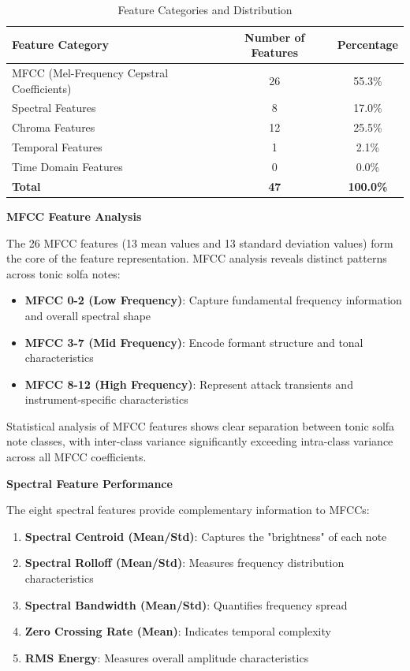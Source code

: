 \documentclass[12pt,a4paper]{article}
\begin{document}
\begin{table}[H]
\centering
\caption{Feature Categories and Distribution}
\label{tab:feature_categories}
\begin{tabular}{@{}lcc@{}}
\toprule
\textbf{Feature Category} & \textbf{Number of Features} & \textbf{Percentage} \\
\midrule
MFCC (Mel-Frequency Cepstral Coefficients) & 26 & 55.3\% \\
Spectral Features & 8 & 17.0\% \\
Chroma Features & 12 & 25.5\% \\
Temporal Features & 1 & 2.1\% \\
Time Domain Features & 0 & 0.0\% \\
\midrule
\textbf{Total} & \textbf{47} & \textbf{100.0\%} \\
\bottomrule
\end{tabular}
\end{table}

\textbf{MFCC Feature Analysis}

The 26 MFCC features (13 mean values and 13 standard deviation values) form the core of the feature representation. MFCC analysis reveals distinct patterns across tonic solfa notes:

\begin{itemize}
\item \textbf{MFCC 0-2 (Low Frequency)}: Capture fundamental frequency information and overall spectral shape
\item \textbf{MFCC 3-7 (Mid Frequency)}: Encode formant structure and tonal characteristics
\item \textbf{MFCC 8-12 (High Frequency)}: Represent attack transients and instrument-specific characteristics
\end{itemize}

Statistical analysis of MFCC features shows clear separation between tonic solfa note classes, with inter-class variance significantly exceeding intra-class variance across all MFCC coefficients.

\textbf{Spectral Feature Performance}

The eight spectral features provide complementary information to MFCCs:

\begin{enumerate}
\item \textbf{Spectral Centroid (Mean/Std)}: Captures the "brightness" of each note
\item \textbf{Spectral Rolloff (Mean/Std)}: Measures frequency distribution characteristics
\item \textbf{Spectral Bandwidth (Mean/Std)}: Quantifies frequency spread
\item \textbf{Zero Crossing Rate (Mean)}: Indicates temporal complexity
\item \textbf{RMS Energy}: Measures overall amplitude characteristics
\end{enumerate}
\end{document}
